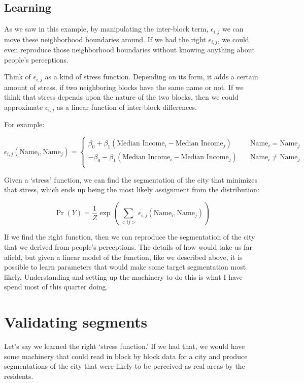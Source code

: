 \documentclass{article}
\begin{document}
\subsection*{Learning}
As we saw in this example, by manipulating the inter-block term,
$\epsilon_{i,j}$ we can move these neighborhood boundaries around. If
we had the right $\epsilon_{i,j}$, we could even reproduce those
neighborhood boundaries without knowing anything about people's
perceptions.

Think of $\epsilon_{i,j}$ as a kind of stress function. Depending on
its form, it adds a certain amount of stress, if two neighboring
blocks have the same name or not. If we think that stress depends upon
the nature of the two blocks, then we could approximate
$\epsilon_{i,j}$ as a linear function of inter-block differences. 

For example: 

\begin{equation}
\epsilon_{i,j}(\text{Name}_i,\text{Name}_j) = \begin{cases}
  \beta_0 + \beta_1(\text{Median Income}_i - \text{Median Income}_j)& \quad\text{Name}_i = \text{Name}_j \\
  - \beta_0 - \beta_1(\text{Median Income}_i - \text{Median Income}_j)& \quad\text{Name}_i \neq \text{Name}_j \\
\end{cases}
\end{equation}

Given a `stress' function, we can find the segmentation of the city
that minimizes that stress, which ends up being the most likely
assignment from the distribution:

\begin{equation}
\Pr(Y) = \frac{1}{Z}\operatorname{exp}\left(\sum_{<i j>}\epsilon_{i,j}(\text{Name}_i,\text{Name}_j)\right) 
\end{equation}

If we find the right function, then we can reproduce the segmentation
of the city that we derived from people's perceptions. The details of
how would take us far afield, but given a linear model of the
function, like we described above, it is possible to learn parameters
that would make some target segmentation most likely. Understanding
and setting up the machinery to do this is what I have spend most of
this quarter doing.

\section*{Validating segments}
Let's say we learned the right `stress function.' If we had that, we
would have some machinery that could read in block by block data for a
city and produce segmentations of the city that were likely to be
perceived as real areas by the residents. 
\end{document}
